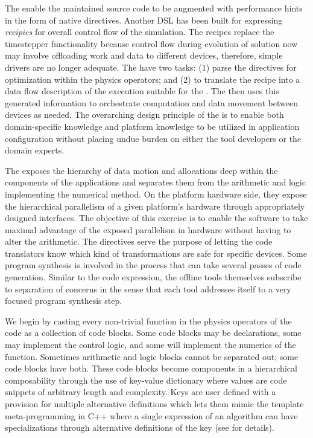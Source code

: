 The \CT enable the maintained source code to be 
augmented with performance hints in the form of \flashx native
directives.  Another DSL has been built for expressing {\it recipies}
for overall control flow of the simulation. The recipes replace the
timestepper functionality because control flow during evolution of
solution now may involve offloading
work and data to different devices, therefore, simple drivers are no
longer adequate. The \CT have two tasks: (1) parse the \flashx
directives for optimization within the physics operators; and (2) to
translate the recipe into a data flow description of the execution
suitable for the \OR.  The {\OR} then uses this generated information
to orchestrate computation and data movement between devices as
needed. The overarching design principle of the {\ORS} is to enable
both domain-specific knowledge and platform knowledge to be utilized
in application configuration without placing undue burden on either
the tool developers or the domain experts.

The {\ORS} exposes the hierarchy of data motion and allocations
deep within the components of the applications and separates them from
the arithmetic and logic implementing the numerical method. On the
platform hardware side, they expose the hierarchical parallelism of a
given platform's hardware through appropriately designed
interfaces. The objective of this exercise is to enable the software
to take maximal advantage of the exposed parallelism in hardware
without having to alter the arithmetic. The directives serve the
purpose of letting the code translators know which kind of
transformations are safe for specific devices.   Some program
synthesis is involved in the process that can take several passes of
code generation. Similar to the code expression, the offline tools
themselves subscribe to separation of concerns in the sense that each
tool addresses itself to a very focused program synthesis step. 

We begin by casting every non-trivial function in the physics
operators of the code as a collection of code blocks. Some code blocks
may be declarations, some may implement the control logic, and some
will implement the numerics of the function. Sometimes arithmetic and
logic blocks cannot be separated out; some code blocks have
both. These code blocks become components in a hierarchical
composability through the use of key-value dictionary where values are
code snippets of arbitrary length and complexity. Keys are user
defined with a provision for multiple alternative definitions which
lets them mimic the template meta-programming in C++ where a single
expression of an algorithm can have specializations through alternative
definitions of the key (see  for details).

